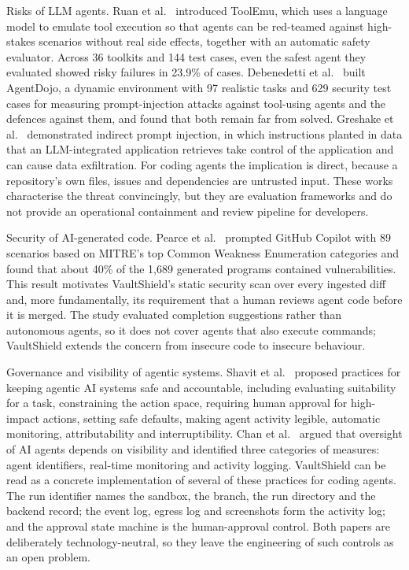 \documentclass[12pt,a4paper,oneside]{report}
\begin{document}
Risks of LLM agents. Ruan et al.~\cite{ref5} introduced ToolEmu, which uses a language model to emulate tool execution so that agents can be red-teamed against high-stakes scenarios without real side effects, together with an automatic safety evaluator. Across 36 toolkits and 144 test cases, even the safest agent they evaluated showed risky failures in 23.9\% of cases. Debenedetti et al.~\cite{ref6} built AgentDojo, a dynamic environment with 97 realistic tasks and 629 security test cases for measuring prompt-injection attacks against tool-using agents and the defences against them, and found that both remain far from solved. Greshake et al.~\cite{ref7} demonstrated indirect prompt injection, in which instructions planted in data that an LLM-integrated application retrieves take control of the application and can cause data exfiltration. For coding agents the implication is direct, because a repository's own files, issues and dependencies are untrusted input. These works characterise the threat convincingly, but they are evaluation frameworks and do not provide an operational containment and review pipeline for developers.

Security of AI-generated code. Pearce et al.~\cite{ref8} prompted GitHub Copilot with 89 scenarios based on MITRE's top Common Weakness Enumeration categories and found that about 40\% of the 1,689 generated programs contained vulnerabilities. This result motivates VaultShield's static security scan over every ingested diff and, more fundamentally, its requirement that a human reviews agent code before it is merged. The study evaluated completion suggestions rather than autonomous agents, so it does not cover agents that also execute commands; VaultShield extends the concern from insecure code to insecure behaviour.

Governance and visibility of agentic systems. Shavit et al.~\cite{ref9} proposed practices for keeping agentic AI systems safe and accountable, including evaluating suitability for a task, constraining the action space, requiring human approval for high-impact actions, setting safe defaults, making agent activity legible, automatic monitoring, attributability and interruptibility. Chan et al.~\cite{ref10} argued that oversight of AI agents depends on visibility and identified three categories of measures: agent identifiers, real-time monitoring and activity logging. VaultShield can be read as a concrete implementation of several of these practices for coding agents. The run identifier names the sandbox, the branch, the run directory and the backend record; the event log, egress log and screenshots form the activity log; and the approval state machine is the human-approval control. Both papers are deliberately technology-neutral, so they leave the engineering of such controls as an open problem.
\end{document}
